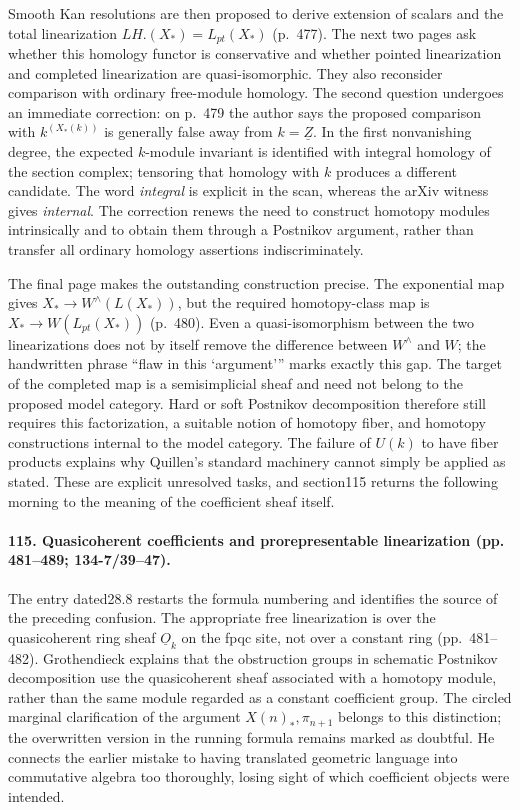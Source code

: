 Smooth Kan resolutions are then proposed to derive extension of scalars and the total linearization $LH.(X_*)=L_{pt}(X_*)$ (p.~477). The next two pages ask whether this homology functor is conservative and whether pointed linearization and completed linearization are quasi-isomorphic. They also reconsider comparison with ordinary free-module homology. The second question undergoes an immediate correction: on p.~479 the author says the proposed comparison with $k^{(X_*(k))}$ is generally false away from $k=\underline Z$. In the first nonvanishing degree, the expected $k$-module invariant is identified with integral homology of the section complex; tensoring that homology with $k$ produces a different candidate. The word \emph{integral} is explicit in the scan, whereas the arXiv witness gives \emph{internal}. The correction renews the need to construct homotopy modules intrinsically and to obtain them through a Postnikov argument, rather than transfer all ordinary homology assertions indiscriminately.

The final page makes the outstanding construction precise. The exponential map gives $X_*\to W^{\wedge}(L(X_*))$, but the required homotopy-class map is $X_*\to W(L_{pt}(X_*))$ (p.~480). Even a quasi-isomorphism between the two linearizations does not by itself remove the difference between $W^{\wedge}$ and $W$; the handwritten phrase ``flaw in this `argument''' marks exactly this gap. The target of the completed map is a semisimplicial sheaf and need not belong to the proposed model category. Hard or soft Postnikov decomposition therefore still requires this factorization, a suitable notion of homotopy fiber, and homotopy constructions internal to the model category. The failure of $U(k)$ to have fiber products explains why Quillen's standard machinery cannot simply be applied as stated. These are explicit unresolved tasks, and section115 returns the following morning to the meaning of the coefficient sheaf itself.

\paragraph{115. Quasicoherent coefficients and prorepresentable linearization (pp. 481--489; 134-7/39--47).}
The entry dated28.8 restarts the formula numbering and identifies the source of the preceding confusion. The appropriate free linearization is over the quasicoherent ring sheaf $\underline O_k$ on the fpqc site, not over a constant ring (pp.~481--482). Grothendieck explains that the obstruction groups in schematic Postnikov decomposition use the quasicoherent sheaf associated with a homotopy module, rather than the same module regarded as a constant coefficient group. The circled marginal clarification of the argument $X(n)_*,\pi_{n+1}$ belongs to this distinction; the overwritten version in the running formula remains marked as doubtful. He connects the earlier mistake to having translated geometric language into commutative algebra too thoroughly, losing sight of which coefficient objects were intended.

